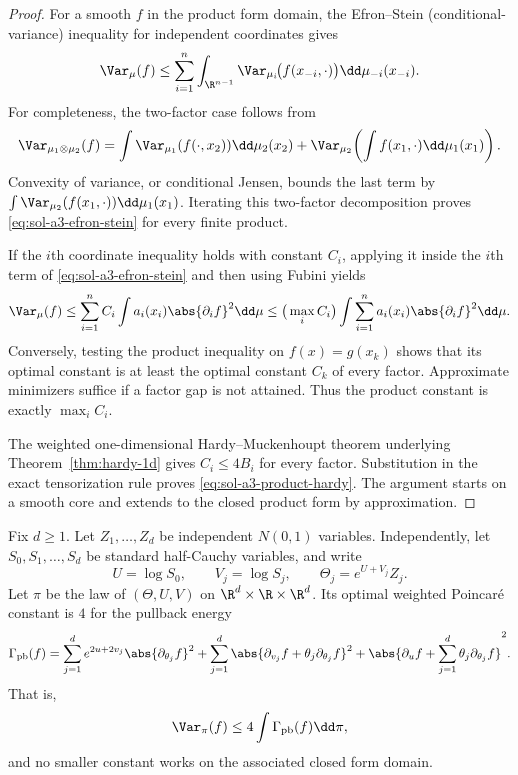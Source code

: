 \documentclass[../main.tex]{subfiles}
\begin{document}
\begin{proof}
For a smooth $f$ in the product form domain, the Efron--Stein (conditional-variance)
inequality for independent coordinates gives
\begin{equation}
\label{eq:sol-a3-efron-stein}
 \Var_\mu(f)
 \le \sum_{i=1}^n
 \int_{\R^{n-1}}
 \Var_{\mu_i}\!\big(f(x_{-i},\mathord\cdot)\big)\dd\mu_{-i}(x_{-i}).
\end{equation}
For completeness, the two-factor case follows from
\[
 \Var_{\mu_1\otimes\mu_2}(f)
 =\int\Var_{\mu_1}(f(\mathord\cdot,x_2))\dd\mu_2(x_2)
  +\Var_{\mu_2}\!\left(\int f(x_1,\mathord\cdot)\dd\mu_1(x_1)\right).
\]
Convexity of variance, or conditional Jensen, bounds the last term by
$\int\Var_{\mu_2}(f(x_1,\mathord\cdot))\dd\mu_1(x_1)$.  Iterating this two-factor
decomposition proves \eqref{eq:sol-a3-efron-stein} for every finite product.

If the $i$th coordinate inequality holds with constant $C_i$, applying it inside the $i$th
term of \eqref{eq:sol-a3-efron-stein} and then using Fubini yields
\[
 \Var_\mu(f)
 \le \sum_{i=1}^n C_i\int a_i(x_i)\abs{\partial_i f}^2\dd\mu
 \le \big(\max_iC_i\big)
       \int\sum_{i=1}^n a_i(x_i)\abs{\partial_i f}^2\dd\mu.
\]
Conversely, testing the product inequality on $f(x)=g(x_k)$ shows that its optimal constant is
at least the optimal constant $C_k$ of every factor.  Approximate minimizers suffice if a
factor gap is not attained.  Thus the product constant is exactly $\max_iC_i$.

The weighted one-dimensional Hardy--Muckenhoupt theorem underlying
Theorem~\ref{thm:hardy-1d} gives $C_i\le4B_i$ for every factor.  Substitution in the exact
tensorization rule proves \eqref{eq:sol-a3-product-hardy}.  The argument starts on a smooth core
and extends to the closed product form by approximation.
\end{proof}

\begin{proposition}
\label{prop:sol-a3-hierarchical-prior}
Fix $d\ge1$.  Let $Z_1,\ldots,Z_d$ be independent $N(0,1)$ variables.  Independently, let
$S_0,S_1,\ldots,S_d$ be standard half-Cauchy variables, and write
\[
 U=\log S_0,\qquad V_j=\log S_j,\qquad
 \Theta_j=e^{U+V_j}Z_j.
\]
Let $\pi$ be the law of $(\Theta,U,V)$ on
$\R^d\times\R\times\R^d$.  Its optimal weighted Poincar\'e constant is $4$ for the
pullback energy
\begin{equation}
\label{eq:sol-a3-pullback-energy}
 \Gamma_{\mathrm{pb}}(f)
 =\sum_{j=1}^d e^{2u+2v_j}\abs{\partial_{\theta_j}f}^2
  +\sum_{j=1}^d
    \abs{\partial_{v_j}f+\theta_j\partial_{\theta_j}f}^2
  +\abs{\partial_uf+\sum_{j=1}^d
                  \theta_j\partial_{\theta_j}f}^2.
\end{equation}
That is,
\begin{equation}
\label{eq:sol-a3-hierarchical-pi}
 \Var_\pi(f)\le4\int\Gamma_{\mathrm{pb}}(f)\dd\pi,
\end{equation}
and no smaller constant works on the associated closed form domain.
\end{proposition}
\end{document}

